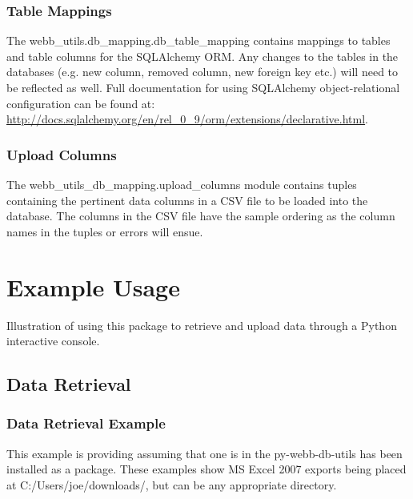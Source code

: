 \documentclass[letterpaper,10pt,english]{sphinxmanual}
\begin{document}
\subsection{Table Mappings}
\label{modules:table-mappings}
The webb\_utils.db\_mapping.db\_table\_mapping contains mappings to tables
and table columns for the SQLAlchemy ORM. Any changes to the tables in
the databases (e.g. new column, removed column, new foreign key etc.)
will need to be reflected as well. Full documentation for using
SQLAlchemy object-relational configuration can be found at:
\href{http://docs.sqlalchemy.org/en/rel\_0\_9/orm/extensions/declarative.html}{http://docs.sqlalchemy.org/en/rel\_0\_9/orm/extensions/declarative.html}.


\subsection{Upload Columns}
\label{modules:upload-columns}
The webb\_utils\_db\_mapping.upload\_columns module contains tuples containing
the pertinent data columns in a CSV file to be loaded into the database.
The columns in the CSV file have the sample ordering as the column names
in the tuples or errors will ensue.


\chapter{Example Usage}
\label{example_usage:example-usage}\label{example_usage::doc}
Illustration of using this package to retrieve and upload data
through a Python interactive console.


\section{Data Retrieval}
\label{example_usage:data-retrieval}

\subsection{Data Retrieval Example}
\label{example_usage:data-retrieval-example}
This example is providing assuming that one is in the
py-webb-db-utils has been installed as a package. These
examples show MS Excel 2007 exports being placed at
C:/Users/joe/downloads/, but can be any appropriate directory.
\end{document}
